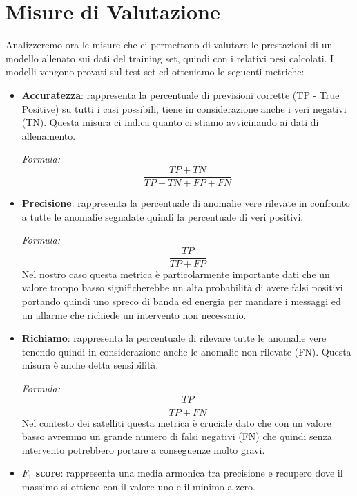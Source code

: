 \chapter{Misure di Valutazione}
Analizzeremo ora le misure che ci permettono di valutare le prestazioni di un modello allenato sui dati del training set, quindi con i relativi pesi calcolati. I modelli vengono provati sul test set ed otteniamo le seguenti metriche:
\begin{itemize}
    \item \textbf{Accuratezza}: rappresenta la percentuale di previsioni corrette (TP - True Positive) su tutti i casi possibili, tiene in considerazione anche i veri negativi (TN).
    Questa misura ci indica quanto ci stiamo avvicinando ai dati di allenamento.
    
    \textit{Formula:}
        \begin{equation}
            \frac{TP+TN}{TP+TN+FP+FN}
        \end{equation}
    
    \item \textbf{Precisione}: rappresenta la percentuale di anomalie vere rilevate in confronto a tutte le anomalie segnalate quindi la percentuale di veri positivi.

    \textit{Formula:}
        \begin{equation}
            \frac{TP}{TP+FP}
        \end{equation}
    Nel nostro caso questa metrica è particolarmente importante dati che un valore troppo basso significherebbe un alta probabilità di avere falsi positivi portando quindi uno spreco di banda ed energia per mandare i messaggi ed un allarme che richiede un intervento non necessario.

    \item \textbf{Richiamo}: rappresenta la percentuale di rilevare tutte le anomalie vere tenendo quindi in considerazione anche le anomalie non rilevate (FN). Questa misura è anche detta sensibilità.

    \textit{Formula:} 
    \begin{equation}
        \frac{TP}{TP+FN}
    \end{equation}
    Nel contesto dei satelliti questa metrica è cruciale dato che con un valore basso avremmo un grande numero di falsi negativi (FN) che quindi senza intervento potrebbero portare a conseguenze molto gravi.
    
    \item \textbf{$F_1$ score}: rappresenta una media armonica tra precisione e recupero dove il massimo si ottiene con il valore uno e il minimo a zero.


\end{itemize}
